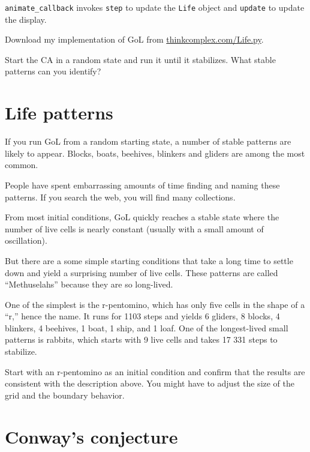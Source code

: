 \documentclass[10pt]{book}
\begin{document}
\verb"animate_callback" invokes {\tt step} to update the {\tt Life}
object and {\tt update} to update the display.

\begin{ex}

Download my implementation of GoL from \url{thinkcomplex.com/Life.py}.

Start the CA in a random state and run it until it stabilizes.
What stable patterns can you identify?

\end{ex}


\section{Life patterns}

If you run GoL from a random starting state, a number of stable
patterns are likely to appear.  Blocks, boats, beehives, blinkers and
gliders are among the most common.

People have spent embarrassing
amounts of time finding and naming these patterns.  If you search
the web, you will find many collections.

From most initial conditions, GoL quickly reaches a stable
state where the number of live cells is nearly constant
(usually with a small amount of oscillation).

But there are a some simple starting conditions that take a
long time to settle down and yield a surprising
number of live cells.  These patterns are called ``Methuselahs''
because they are so long-lived.

One of the simplest is the
r-pentomino, which has only five cells in the shape of a ``r,'' hence
the name.  It runs for 1103 steps and yields 6 gliders, 8 blocks, 4
blinkers, 4 beehives, 1 boat, 1 ship, and 1 loaf.
One of the longest-lived small patterns is rabbits, which starts
with 9 live cells and takes 17 331 steps to stabilize.

\begin{ex}

Start with an r-pentomino as an initial condition and confirm
that the results are consistent with the description above.
You might have to adjust the size of the grid and the boundary behavior.

\end{ex}


\section{Conway's conjecture}
\end{document}

